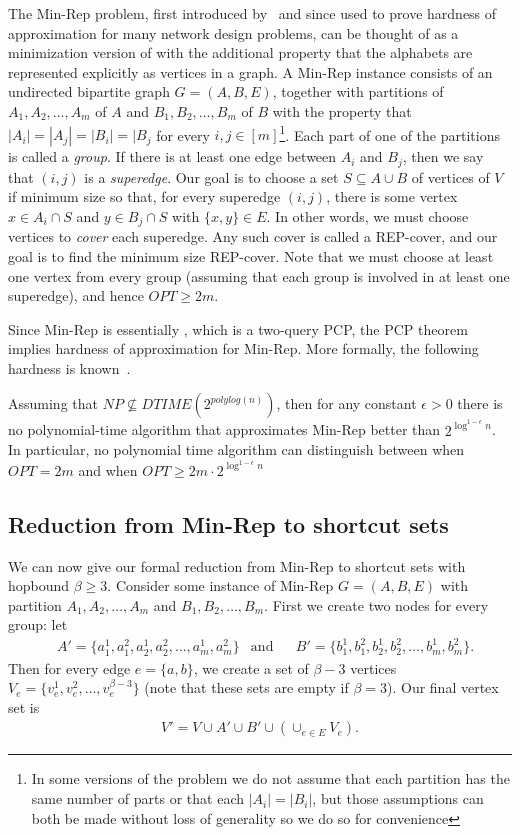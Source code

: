 The Min-Rep problem, first introduced by~\cite{Kor01} and since used to prove hardness of approximation for many network design problems, can be thought of as a minimization version of \LabelCover with the additional property that the alphabets are represented explicitly as vertices in a graph.  A Min-Rep instance consists of an undirected bipartite graph $G = (A, B, E)$, together with partitions of $A_1, A_2, \dots, A_{m}$ of $A$ and $B_1, B_2, \dots, B_m$ of $B$ with the property that $|A_i| = |A_j| = |B_i| = |B_j$ for every $i,j \in [m]$\footnote{In some versions of the problem we do not assume that each partition has the same number of parts or that each $|A_i|=|B_i|$, but those assumptions can both be made without loss of generality so we do so for convenience}.  Each part of one of the partitions is called a \emph{group}.  If there is at least one edge between $A_i$ and $B_j$, then we say that $(i,j)$ is a \emph{superedge}.  Our goal is to choose a set $S \subseteq A \cup B$ of vertices of $V$ if minimum size so that, for every superedge $(i,j)$, there is some vertex $x \in A_i \cap S$ and $y \in B_j \cap S$ with $\{x,y\} \in E$.  In other words, we must choose vertices to \emph{cover} each superedge.  Any such cover is called a REP-cover, and our goal is to find the minimum size REP-cover.  Note that we must choose at least one vertex from every group (assuming that each group is involved in at least one superedge), and hence $OPT \geq 2m$.  

Since Min-Rep is essentially \LabelCover, which is a two-query PCP, the PCP theorem implies hardness of approximation for Min-Rep.  More formally, the following hardness is known~\cite{Kor01}.

\begin{theorem} \label{thm:MinRep-hardness}
    Assuming that $NP \not\subseteq DTIME(2^{polylog(n)})$, then for any constant $\epsilon > 0$ there is no polynomial-time algorithm that approximates Min-Rep better than $2^{\log^{1-\epsilon} n}$.  In particular, no polynomial time algorithm can distinguish between when $OPT = 2m$ and when $OPT \geq 2m \cdot 2^{\log^{1-\epsilon} n}$
\end{theorem}


\subsection{Reduction from Min-Rep to shortcut sets}
We can now give our formal reduction from Min-Rep to shortcut sets with hopbound $\beta \geq 3$.  Consider some instance of Min-Rep $G = (A, B, E)$ with partition $A_1, A_2, \dots, A_m$ and $B_1, B_2, \dots, B_m$.  First we create two nodes for every group: let 
\begin{align*}
&A' = \{a_1^1, a_1^2, a_2^1, a_2^2, \dots, a_m^1, a_m^2\} & \text{and} &  &B' = \{b_1^1, b_1^2, b_2^1,b_2^2, \dots, b_m^1, b_m^2\}.
\end{align*}
Then for every edge $e = \{a, b\}$, we create a set of $\beta - 3$ vertices $V_e = \{v_e^1, v_e^2, \dots, v_e^{\beta-3}\}$ (note that these sets are empty if $\beta=3$).  Our final vertex set is 
\begin{align*}
    V' = V \cup A' \cup B' \cup (\cup_{e \in E} V_e).
\end{align*}

